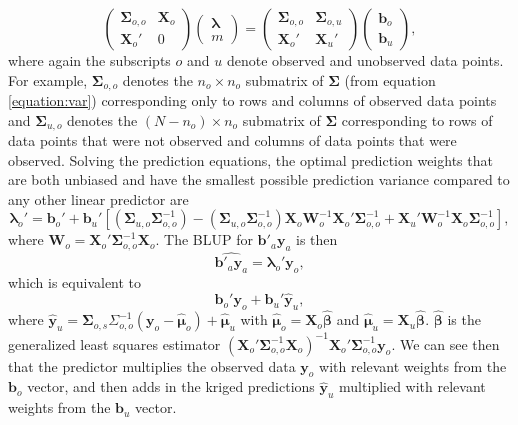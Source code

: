 \documentclass[smallextended]{svjour3}       %
\begin{document}
\begin{equation}
\begin{pmatrix}
\bm{\Sigma}_{o, o} & \mathbf{X}_o \\
\mathbf{X}_o' & 0
\end{pmatrix} 
\begin{pmatrix}
\bm{\lambda} \\
m
\end{pmatrix} = 
\begin{pmatrix}
\bm{\Sigma}_{o, o} & \bm{\Sigma}_{o, u} \\
\mathbf{X}_{o}' & \mathbf{X}_{u}'
\end{pmatrix} 
\begin{pmatrix}
\mathbf{b}_{o} \\
\mathbf{b}_{u}
\end{pmatrix},
\end{equation} \noindent where again the subscripts \(o\) and \(u\)
denote observed and unobserved data points. For example,
\(\bm{\Sigma}_{o, o}\) denotes the \(n_o \times n_o\) submatrix of
\(\bm{\Sigma}\) (from equation \ref{equation:var}) corresponding only to
rows and columns of observed data points and \(\bm{\Sigma}_{u, o}\)
denotes the \((N - n_o) \times n_o\) submatrix of \(\bm{\Sigma}\)
corresponding to rows of data points that were not observed and columns
of data points that were observed. Solving the prediction equations, the
optimal prediction weights that are both unbiased and have the smallest
possible prediction variance compared to any other linear predictor are
\mbox{} \begin{equation}
\bm{\lambda}_o' = \mathbf{b}_{o}' + \mathbf{b}_{u}'\left[ (\bm{\Sigma}_{u, o}\bm{\Sigma}_{o, o}^{-1}) - (\bm{\Sigma}_{u, o} \bm{\Sigma}_{o, o}^{-1})\mathbf{X}_o\mathbf{W}_o^{-1}\mathbf{X}_o'\bm{\Sigma}_{o, o}^{-1} + \mathbf{X}_{u}'\mathbf{W}_o^{-1}\mathbf{X}_o \bm{\Sigma}_{o, o}^{-1} \right],
\end{equation} \noindent where
\(\mathbf{W}_o = \mathbf{X}_o'\bm{\Sigma}_{o, o}^{-1}\mathbf{X}_o\). The
BLUP for \(\mathbf{b}'_a \mathbf{y}_a\) is then \mbox{}
\begin{equation} \label{equation:blup}
\widehat{\mathbf{b}'_a \mathbf{y}_a} = \bm{\lambda}_o' \mathbf{y}_o,
\end{equation} \noindent which is equivalent to \mbox{}
\begin{equation*}
\mathbf{b}_{o}'\mathbf{y}_{o} + \mathbf{b}_{u}' \mathbf{\hat{y}}_{u},
\end{equation*} \noindent where
\(\mathbf{\hat{y}}_{u} = \bm{\Sigma}_{o, s} \Sigma_{o, o}^{-1} (\mathbf{y}_o - \bm{\hat{\mu}}_o) + \bm{\hat{\mu}}_u\)
with \(\bm{\hat{\mu}}_o = \mathbf{X}_o \bm{\hat{\beta}}\) and
\(\bm{\hat{\mu}}_u = \mathbf{X}_u \bm{\hat{\beta}}\).
\(\bm{\hat{\beta}}\) is the generalized least squares estimator
\((\mathbf{X}_o' \bm{\Sigma}_{o, o}^{-1} \mathbf{X}_o)^{-1} \mathbf{X}_o' \bm{\Sigma}_{o, o}^{-1} \mathbf{y}_o\).
We can see then that the predictor multiplies the observed data
\(\mathbf{y}_o\) with relevant weights from the \(\mathbf{b}_o\) vector,
and then adds in the kriged predictions \(\mathbf{\hat{y}}_{u}\)
multiplied with relevant weights from the \(\mathbf{b}_u\) vector.
\end{document}

